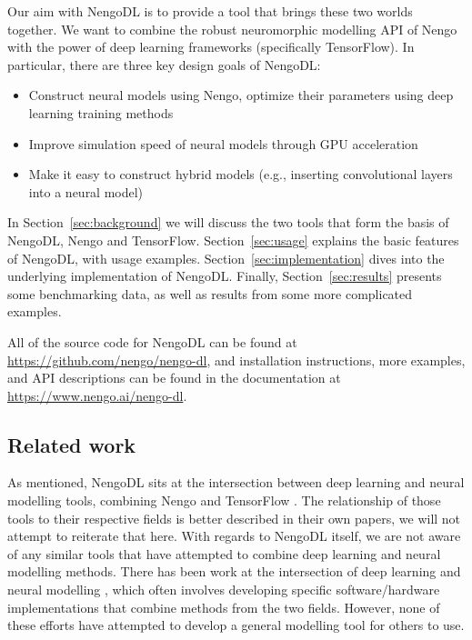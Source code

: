 \documentclass{article}
\begin{document}
Our aim with NengoDL is to provide a tool that brings these two worlds together.  We want to combine the robust neuromorphic modelling API of Nengo with the power of deep learning frameworks (specifically TensorFlow).  In particular, there are three key design goals of NengoDL:

\begin{itemize}
\item Construct neural models using Nengo, optimize their parameters using deep learning training methods
\item Improve simulation speed of neural models through GPU acceleration
\item Make it easy to construct hybrid models (e.g., inserting convolutional layers into a neural model)
\end{itemize}

In Section~\ref{sec:background} we will discuss the two tools that form the basis of NengoDL, Nengo and TensorFlow.  Section~\ref{sec:usage} explains the basic features of NengoDL, with usage examples.  Section~\ref{sec:implementation} dives into the underlying implementation of NengoDL.  Finally, Section~\ref{sec:results} presents some benchmarking data, as well as results from some more complicated examples.

All of the source code for NengoDL can be found at \url{https://github.com/nengo/nengo-dl}, and installation instructions, more examples, and API descriptions can be found in the documentation at \url{https://www.nengo.ai/nengo-dl}.

\subsection{Related work}

As mentioned, NengoDL sits at the intersection between deep learning and neural modelling tools, combining Nengo \citep{Bekolay2014} and TensorFlow \citep{Abadi2016}.  The relationship of those tools to their respective fields is better described in their own papers, we will not attempt to reiterate that here.  With regards to NengoDL itself, we are not aware of any similar tools that have attempted to combine deep learning and neural modelling methods.  There has been work at the intersection of deep learning and neural modelling \citep[e.g.,][]{Esser2015,Hunsberger2015,Kriegeskorte2015,Yamins2016,Lee2016}, which often involves developing specific software/hardware implementations that combine methods from the two fields. However, none of these efforts have attempted to develop a general modelling tool for others to use.
\end{document}
